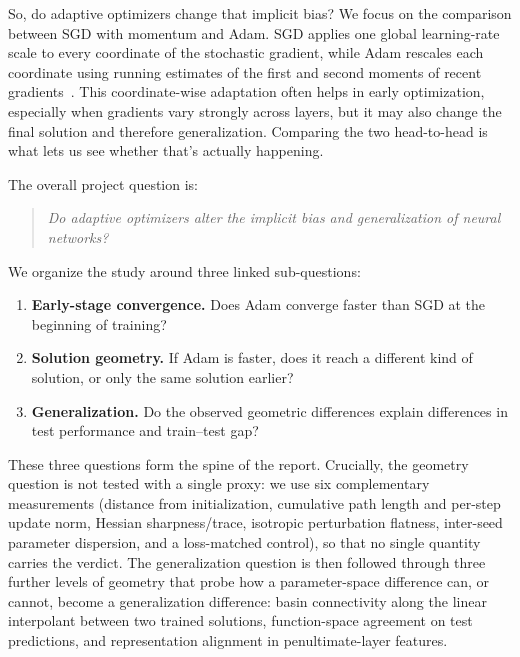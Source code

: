 \documentclass[11pt]{article}
\begin{document}
So, do adaptive optimizers change that implicit bias? We focus on the comparison between SGD with momentum and Adam. SGD applies one global learning-rate scale to every coordinate of the stochastic gradient, while Adam rescales each coordinate using running estimates of the first and second moments of recent gradients~\cite{kingma2015adam}. This coordinate-wise adaptation often helps in early optimization, especially when gradients vary strongly across layers, but it may also change the final solution and therefore generalization. Comparing the two head-to-head is what lets us see whether that's actually happening.

The overall project question is:
\begin{quote}
\emph{Do adaptive optimizers alter the implicit bias and generalization of neural networks?}
\end{quote}
We organize the study around three linked sub-questions:
\begin{enumerate}
\item \textbf{Early-stage convergence.} Does Adam converge faster than SGD at the beginning of training?
\item \textbf{Solution geometry.} If Adam is faster, does it reach a different kind of solution, or only the same solution earlier?
\item \textbf{Generalization.} Do the observed geometric differences explain differences in test performance and train--test gap?
\end{enumerate}
These three questions form the spine of the report. Crucially, the geometry question is not tested with a single proxy: we use six complementary measurements (distance from initialization, cumulative path length and per-step update norm, Hessian sharpness/trace, isotropic perturbation flatness, inter-seed parameter dispersion, and a loss-matched control), so that no single quantity carries the verdict. The generalization question is then followed through three further levels of geometry that probe how a parameter-space difference can, or cannot, become a generalization difference: basin connectivity along the linear interpolant between two trained solutions, function-space agreement on test predictions, and representation alignment in penultimate-layer features.
\end{document}
